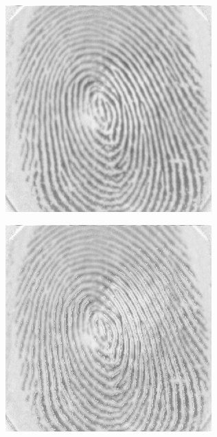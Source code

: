 \documentclass{beamer}
\begin{document}
{\begin{figure}[!ht]
\begin{subfigure}[ht]{0.15\textwidth}
        \end{subfigure}
    \end{figure}
    \begin{figure}[!ht]
        \centering
        \begin{subfigure}[ht]{0.15\textwidth}
            \includegraphics[width=\textwidth]{fingerprints/2000Db1a/2_3_src.jpg}
        \end{subfigure}
        \qquad
        \begin{subfigure}[ht]{0.15\textwidth}
            \includegraphics[width=\textwidth]{fingerprints/2000Db1a/2_3_background.jpg}

\end{subfigure}
\end{figure}}
\end{document}
